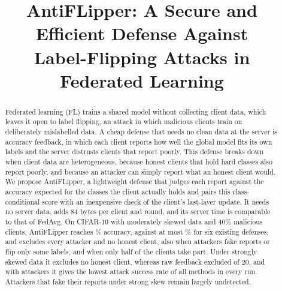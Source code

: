 \documentclass[conference]{IEEEtran}
\begin{document}
\title{\fontsize{21}{25}\selectfont AntiFLipper: A Secure and Efficient Defense Against\\ Label-Flipping Attacks in Federated Learning}

\author{
}

\maketitle

\begin{abstract}
Federated learning (FL) trains a shared model without collecting client data, which leaves it open to label flipping, an attack in which malicious clients train on deliberately mislabelled data. A cheap defense that needs no clean data at the server is accuracy feedback, in which each client reports how well the global model fits its own labels and the server distrusts clients that report poorly. This defense breaks down when client data are heterogeneous, because honest clients that hold hard classes also report poorly, and because an attacker can simply report what an honest client would. We propose AntiFLipper, a lightweight defense that judges each report against the accuracy expected for the classes the client actually holds and pairs this class-conditional score with an inexpensive check of the client's last-layer update. It needs no server data, adds 84 bytes per client and round, and its server time is comparable to that of FedAvg. On CIFAR-10 with moderately skewed data and 40\% malicious clients, AntiFLipper reaches \headAcc\% accuracy, against at most \headAccFLTrust\% for six existing defenses, and excludes every attacker and no honest client, also when attackers fake reports or flip only some labels, and when only half of the clients take part. Under strongly skewed data it excludes no honest client, whereas raw feedback excluded \cleanHonRaw{} of 20, and with attackers it gives the lowest attack success rate of all methods in every run. Attackers that fake their reports under strong skew remain largely undetected.
\end{abstract}
\end{document}
